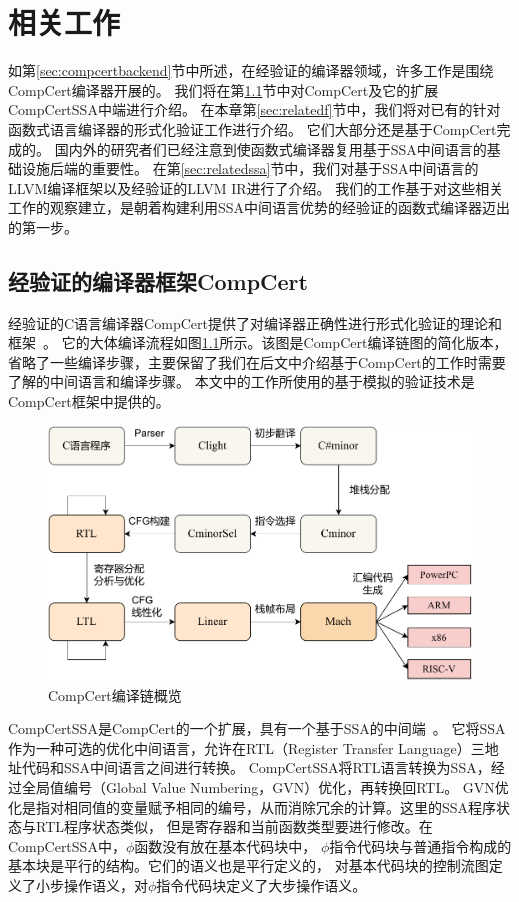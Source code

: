
\chapter{相关工作} \label{ch:related}

如第\ref{sec:compcertbackend}节中所述，在经验证的编译器领域，许多工作是围绕CompCert编译器开展的。
我们将在第\ref{sec:relatedc}节中对CompCert及它的扩展CompCertSSA中端进行介绍。
在本章第\ref{sec:relatedf}节中，我们将对已有的针对函数式语言编译器的形式化验证工作进行介绍。
它们大部分还是基于CompCert完成的。 
国内外的研究者们已经注意到使函数式编译器复用基于SSA中间语言的基础设施后端的重要性。
在第\ref{sec:relatedssa}节中，我们对基于SSA中间语言的LLVM编译框架以及经验证的LLVM IR进行了介绍。
我们的工作基于对这些相关工作的观察建立，是朝着构建利用SSA中间语言优势的经验证的函数式编译器迈出的第一步。

\section{经验证的编译器框架CompCert} \label{sec:relatedc}

经验证的C语言编译器CompCert提供了对编译器正确性进行形式化验证的理论和框架~\cite{leroy2009formally}。
它的大体编译流程如图\ref{fig:compcert}所示。该图是CompCert编译链图的简化版本，
省略了一些编译步骤，主要保留了我们在后文中介绍基于CompCert的工作时需要了解的中间语言和编译步骤。
本文中的工作所使用的基于模拟的验证技术是CompCert框架中提供的。
\begin{figure}[htbp]
    \centering
    \includegraphics[width=0.8\linewidth]{figures/compcert.pdf}
    \caption{CompCert编译链概览}\label{fig:compcert}
\end{figure}

CompCertSSA是CompCert的一个扩展，具有一个基于SSA的中间端~\cite{compcertssa}。
它将SSA作为一种可选的优化中间语言，允许在RTL（Register Transfer Language）三地址代码和SSA中间语言之间进行转换。
CompCertSSA将RTL语言转换为SSA，经过全局值编号（Global Value Numbering，GVN）优化，再转换回RTL。
GVN优化是指对相同值的变量赋予相同的编号，从而消除冗余的计算。这里的SSA程序状态与RTL程序状态类似，
但是寄存器和当前函数类型要进行修改。在CompCertSSA中，$\phi$函数没有放在基本代码块中，
$\phi$指令代码块与普通指令构成的基本块是平行的结构。它们的语义也是平行定义的，
对基本代码块的控制流图定义了小步操作语义，对$\phi$指令代码块定义了大步操作语义。

